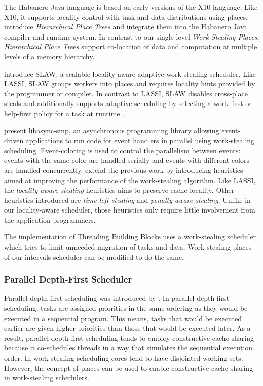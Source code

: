 The Habanero Java \cite{HJ} language is based on early versions of the
X10 language. Like X10, it supports locality control with task and
data distributions using places. \textcite{Yan2009} introduce
\emph{Hierarchical Place Trees} and integrate them into the Habanero
Java compiler and runtime system. In contrast to our single level
\emph{Work-Stealing Places}, \emph{Hierarchical Place Trees} support
co-location of data and computation at multiple levels of a memory
hierarchy.

\textcite{Guo2010} introduce SLAW, a scalable locality-aware adaptive
work-stealing scheduler. Like LASSI, SLAW groups workers into places
and requires locality hints provided by the programmer or compiler. In
contrast to LASSI, SLAW disables cross-place steals and additionally
supports adaptive scheduling by selecting a work-first or help-first
policy for a task at runtime \cite{Guo2009}.

\textcite{Zeldovich2003} present libasync-smp, an asynchronous
programming library allowing event-driven applications to run code for
event handlers in parallel using work-stealing
scheduling. Event-coloring is used to control the parallelism between
events: events with the same color are handled serially and events
with different colors are handled concurrently. \textcite{Gaud2010}
extend the previous work by introducing heuristics aimed at improving
the performance of the work-stealing algorithm. Like LASSI, the
\emph{locality-aware stealing} heuristics aims to preserve cache
locality. Other heuristics introduced are \emph{time-left stealing}
and \emph{penalty-aware stealing}. Unlike in our locality-aware
scheduler, those heuristics only require little involvement from the
application programmers.

The implementation of Threading Building Blocks \cite{Contreras2008,
  Reinders2007} uses a work-stealing scheduler which tries to limit
unneeded migration of tasks and data. Work-stealing places of our
intervals scheduler can be modified to do the same.

\subsubsection{Parallel Depth-First Scheduler}

Parallel depth-first scheduling was introduced by
\textcite{Blelloch1999}. In parallel depth-first scheduling, tasks are
assigned priorities in the same ordering as they would be executed in
a sequential program. This means, tasks that would be executed earlier
are given higher priorities than those that would be executed
later. As a result, parallel depth-first scheduling tends to employ
constructive cache sharing \cite{Liaskovitis2006, Chen2007} because it
co-schedules threads in a way that simulates the sequential execution
order. In work-stealing scheduling cores tend to have disjointed
working sets. However, the concept of places can be used to enable
constructive cache sharing in work-stealing schedulers.


